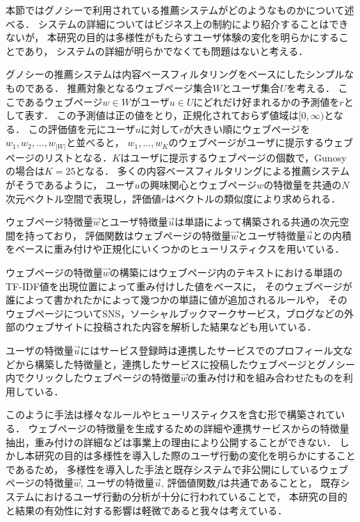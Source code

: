 \documentclass[japanese]{jnlp_1.4}
\begin{document}
本節ではグノシーで利用されている推薦システムがどのようなものかについて述べる．
システムの詳細についてはビジネス上の制約により紹介することはできないが，
本研究の目的は多様性がもたらすユーザ体験の変化を明らかにすることであり，
システムの詳細が明らかでなくても問題はないと考える．

グノシーの推薦システムは内容ベースフィルタリングをベースにしたシンプルなものである\cite{Jannach2010}．
推薦対象となるウェブページ集合$W$とユーザ集合$U$を考える．
ここであるウェブページ$w \in W$がユーザ$u \in U$にどれだけ好まれるかの予測値を$r$として表す．
この予測値は正の値をとり，正規化されておらず値域は$[0, \infty)$となる．
この評価値を元にユーザ$u$に対して$r$が大きい順にウェブページを$w_1,w_2,...,w_{|W|}$と並べると，
$w_1, ..., w_K$のウェブページがユーザに提示するウェブページのリストとなる．$K$はユーザに提示するウェブページの個数で，Gunosyの場合は$K=25$となる．
多くの内容ベースフィルタリングによる推薦システムがそうであるように，
ユーザ$u$の興味関心とウェブページ$w$の特徴量を共通の$N$次元ベクトル空間で表現し，評価値$r$はベクトルの類似度により求められる．

ウェブページ特徴量$\vec{w}$とユーザ特徴量$\vec{u}$は単語によって構築される共通の次元空間を持っており，
評価関数はウェブページの特徴量$\vec{w}$とユーザ特徴量$\vec{u}$との内積をベースに重み付けや正規化にいくつかのヒューリスティクスを用いている．

ウェブページの特徴量$\vec{w}$の構築にはウェブページ内のテキストにおける単語のTF-IDF値を出現位置によって重み付けした値をベースに，
そのウェブページが誰によって書かれたかによって幾つかの単語に値が追加されるルールや，
そのウェブページについてSNS，ソーシャルブックマークサービス，ブログなどの外部のウェブサイトに投稿された内容を解析した結果なども用いている．

ユーザの特徴量$\vec{u}$にはサービス登録時は連携したサービスでのプロフィール文などから構築した特徴量と，連携したサービスに投稿したウェブページとグノシー内でクリックしたウェブページの特徴量$\vec{w}$の重み付け和を組み合わせたものを利用している．

このように手法は様々なルールやヒューリスティクスを含む形で構築されている．
ウェブページの特徴量を生成するための詳細や連携サービスからの特徴量抽出，重み付けの詳細などは事業上の理由により公開することができない．
しかし本研究の目的は多様性を導入した際のユーザ行動の変化を明らかにすることであるため，
多様性を導入した手法と既存システムで非公開にしているウェブページの特徴量$\vec{w}$, ユーザの特徴量$\vec{u}$, 評価値関数$f$は共通であることと，
既存システムにおけるユーザ行動の分析が十分に行われていることで，
本研究の目的と結果の有効性に対する影響は軽微であると我々は考えている．
\end{document}
